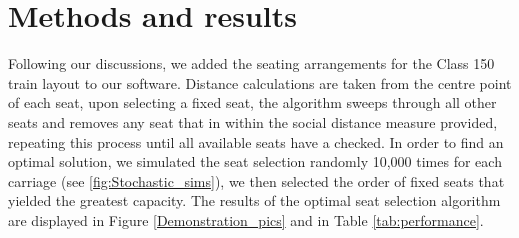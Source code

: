\documentclass[11pt,a4paper]{article}
\begin{document}
\section*{Methods and results}
Following our discussions, we added the seating arrangements for the Class 150 train layout to our software. Distance calculations are taken from the centre point of each seat, upon selecting a fixed seat, the algorithm sweeps through all other seats and removes any seat that in within the social distance measure provided, repeating this process until all available seats have a checked. In order to find an optimal solution, we simulated the seat selection randomly 10,000 times for each carriage (see \autoref{fig:Stochastic_sims}), we then selected the order of fixed seats that yielded the greatest capacity. The results of the optimal seat selection algorithm are displayed in Figure \ref{Demonstration_pics} and in Table \ref{tab:performance}. 
\end{document}
